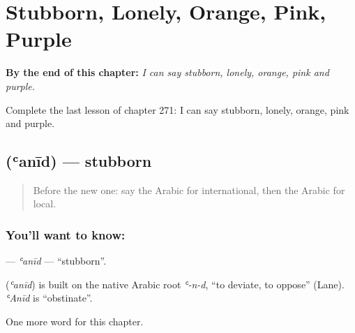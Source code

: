 
\chapter{Stubborn, Lonely, Orange, Pink, Purple}
\label{ch:ar-stubborn-lonely-orange-pink-purple}

\begin{chapteropening}
\textbf{By the end of this chapter:} \emph{I can say stubborn, lonely, orange, pink and purple.}

Complete the last lesson of chapter 271: I can say stubborn, lonely, orange, pink and purple.
\end{chapteropening}

\section[\texorpdfstring{\ar{عنيد} (ʿanīd)}{عنيد (ʿanīd)}]{ (ʿanīd) — stubborn}

\label{lesson:AR-C271-anid}



\begin{quote}
Before the new one: say the Arabic for international, then the Arabic for local.
\end{quote}

\subsection*{You'll want to know: }
\textbf{} — \emph{ʿanīd} — \textquotedblleft{}stubborn\textquotedblright{}.

\begin{cousinweb}
\textbf{} (\emph{ʿanīd}) is built on the native Arabic root \emph{ʿ-n-d}, \textquotedblleft{}to deviate, to oppose\textquotedblright{} (Lane). \emph{ʿAnīd} is \textquotedblleft{}obstinate\textquotedblright{}.
\end{cousinweb}

\begin{grammarlens}[title={What you've built}]
One more word for this chapter.
\end{grammarlens}

